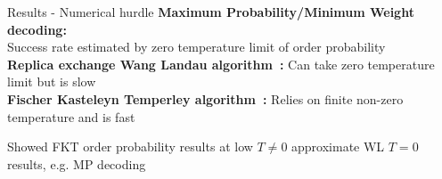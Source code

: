 \documentclass{dfki}
\begin{document}
\begin{frame}{Results - Numerical hurdle}
	\textbf{Maximum Probability/Minimum Weight decoding:}\\
	Success rate estimated by zero temperature limit of order probability\\
	\pause
	\vspace{0.5cm}
	\textbf{Replica exchange Wang Landau algorithm~:} Can take zero temperature limit but is slow\\
	\vspace{0.5cm}
	\textbf{Fischer Kasteleyn Temperley algorithm~:} Relies on finite non-zero temperature and is fast\\
	\pause
	\begin{tcolorbox}[colback=osakared!5!white, colframe=osakared, width=13cm, arc=2mm]
		Showed FKT order probability results at low $T\neq 0$ approximate WL $T=0$ results, e.g. MP decoding
	\end{tcolorbox}
\end{frame}
\end{document}
